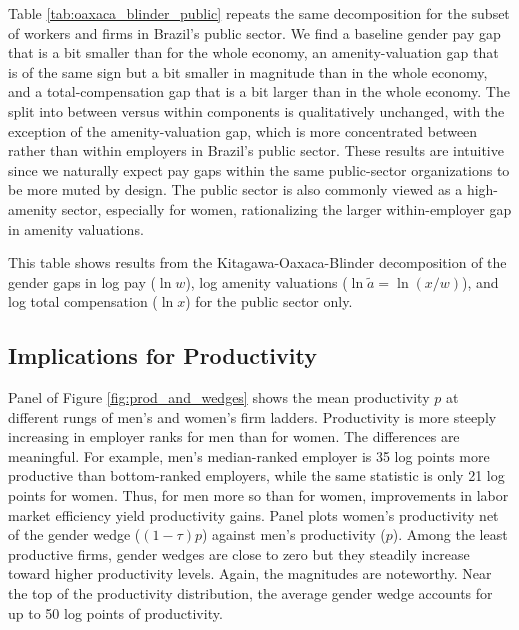 Table \ref{tab:oaxaca_blinder_public} repeats the same decomposition for the subset of workers and firms in Brazil's public sector. We find a baseline gender pay gap that is a bit smaller than for the whole economy, an amenity-valuation gap that is of the same sign but a bit smaller in magnitude than in the whole economy, and a total-compensation gap that is a bit larger than in the whole economy. The split into between versus within components is qualitatively unchanged, with the exception of the amenity-valuation gap, which is more concentrated between rather than within employers in Brazil's public sector. These results are intuitive since we naturally expect pay gaps within the same public-sector organizations to be more muted by design. The public sector is also commonly viewed as a high-amenity sector, especially for women, rationalizing the larger within-employer gap in amenity valuations.

%
\begin{table}[htbp!]
    \caption{Kitagawa-Oaxaca-Blinder decompositions---public sector only}
    \label{tab:oaxaca_blinder_public}
    \resizebox{\textwidth}{!}{%
    
    }
    \begin{tablenotes}
        \footnotesize
        This table shows results from the Kitagawa-Oaxaca-Blinder decomposition of the gender gaps in log pay ($\ln w$), log amenity valuations ($\ln \tilde{a} = \ln(x/w)$), and log total compensation ($\ln x$) for the public sector only. %
    \end{tablenotes}
    \begin{tablenotes}[Source]
        \sourcemodel%
    \end{tablenotes}
\end{table}
%


\subsection{Implications for Productivity\label{subsec:pay_amenities_ladders}}

Panel  of Figure \ref{fig:prod_and_wedges} shows the mean productivity $p$ at different rungs of men's and women's firm ladders. Productivity is more steeply increasing in employer ranks for men than for women. The differences are meaningful. For example, men's median-ranked employer is 35 log points more productive than bottom-ranked employers, while the same statistic is only 21 log points for women. Thus, for men more so than for women, improvements in labor market efficiency yield productivity gains. %
%
Panel  plots women's productivity net of the gender wedge ($(1 - \tau)p$) against men's productivity ($p$). Among the least productive firms, gender wedges are close to zero but they steadily increase toward higher productivity levels. Again, the magnitudes are noteworthy. Near the top of the productivity distribution, the average gender wedge accounts for up to 50 log points of productivity.

